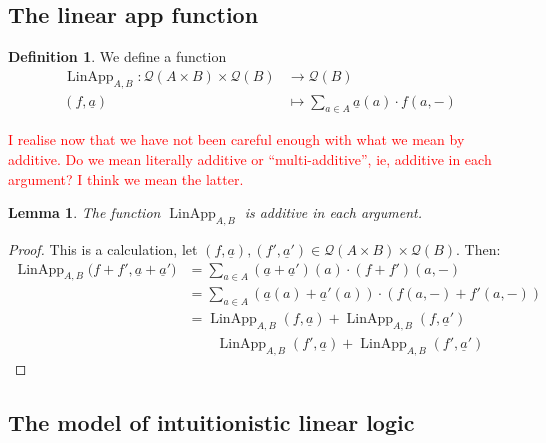 \documentclass[12pt]{article}
\theoremstyle{plain}
\newtheorem{lemma}[thm]{Lemma}
\theoremstyle{definition}
\newtheorem{defn}[thm]{Definition} %
\newcommand{\call}[1]{\mathcal{#1}}
\newcommand{\lto}{\longrightarrow}
\begin{document}
\subsection{The linear app function}
\begin{defn}
We define a function
\begin{align*}
	\operatorname{LinApp}_{A,B}: \call{Q}(A \times B) \times \call{Q}(B) &\lto \call{Q}(B)\\
	(f, \underline{a}) &\longmapsto \sum_{a \in A}\underline{a}(a)\cdot f(a, -)
\end{align*}
\end{defn}

\textcolor{red}{I realise now that we have not been careful enough with what we mean by additive. Do we mean literally additive or ``multi-additive'', ie, additive in each argument? I think we mean the latter.}

\begin{lemma}
The function $\operatorname{LinApp}_{A,B}$ is additive in each argument.
\end{lemma}
\begin{proof}
This is a calculation, let $(f, \underline{a}), (f', \underline{a}') \in \call{Q}(A \times B) \times \call{Q}(B)$. Then:
\begin{align*}
	\operatorname{LinApp}_{A,B}\big(f + f', \underline{a} + \underline{a}'\big) &= \sum_{a \in A}(\underline{a} + \underline{a}')(a)\cdot (f + f')(a, -)\\
	&= \sum_{a \in A}(\underline{a}(a) + \underline{a}'(a))\cdot (f(a, -) + f'(a, -))\\
	&= \operatorname{LinApp}_{A,B}(f, \underline{a}) + \operatorname{LinApp}_{A,B}(f, \underline{a}')\\
	&\qquad \operatorname{LinApp}_{A,B}(f', \underline{a}) + \operatorname{LinApp}_{A,B}(f', \underline{a}')
\end{align*}
\end{proof}

\subsection{The model of intuitionistic linear logic}
\end{document}
